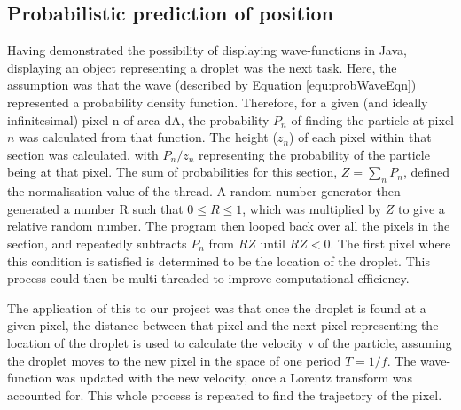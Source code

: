 \subsection{Probabilistic prediction of position}
Having demonstrated the possibility of displaying wave-functions in Java, displaying an object representing a droplet was the next task. Here, the assumption was that the wave (described by Equation \ref{equ:probWaveEqn}) represented a probability density function. Therefore, for a given (and ideally infinitesimal) pixel n of area dA, the probability $P_n$ of finding the particle at pixel $n$ was calculated from that function. The height ($z_n$) of each pixel within that section was calculated, with ${P_n}/{z_n}$ representing the probability of the particle being at that pixel. The sum of probabilities for this section, $Z=\sum_n{P_n}$, defined the normalisation value of the thread. A random number generator then generated a number R such that $0\leq R \leq 1$, which was multiplied by $Z$ to give a relative random number. The program then looped back over all the pixels in the section, and repeatedly subtracts $P_n$ from $RZ$ until $RZ<0$. The first pixel where this condition is satisfied is determined to be the location of the droplet. This process could then be multi-threaded to improve computational efficiency.

The application of this to our project was that once the droplet is found at a given pixel, the distance between that pixel and the next pixel representing the location of the droplet is used to calculate the velocity v of the particle, assuming the droplet moves to the new pixel in the space of one period $T=1/f$. The wave-function was updated with the new velocity, once a Lorentz transform was accounted for. This whole process is repeated to find the trajectory of the pixel.


